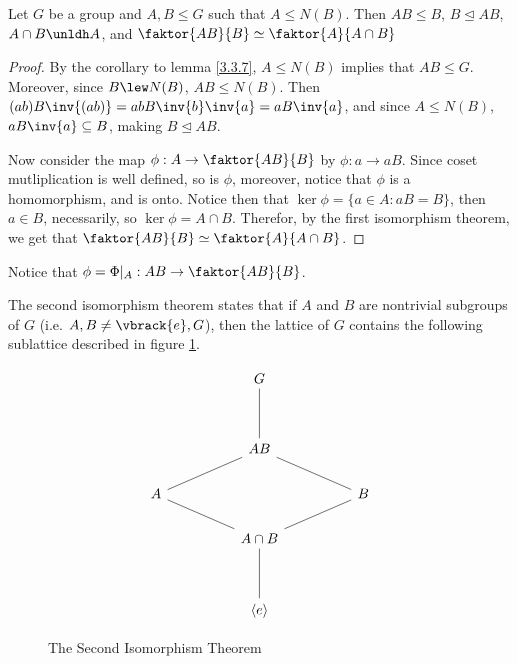 \begin{theorem}\label{3.4.4}
    Let $G$ be a group and  $A,B \leq G$ such that  $A \leq N(B)$. Then $AB \leq
    B$,  $B \unlhd AB$,  $A \cap B \unldh A$, and  $\faktor{AB}{B} \simeq
    \faktor{A}{A \cap B}$
\end{theorem}
\begin{proof}
    By the corollary to lemma \ref{3.3.7}, $A \leq N(B)$ implies that $AB \leq
    G$. Moreover, since  $B \lew N(B)$, $AB \leq N(B)$. Then
    $(ab)B\inv{(ab)}=abB\inv{b}\inv{a}=aB\inv{a}$, and since $A \leq N(B)$,
    $aB\inv{a} \subseteq B$, making $B \unlhd AB$.

    Now consider the map $\phi:A \rightarrow \faktor{AB}{B}$ by $\phi:a
    \rightarrow aB$. Since coset mutliplication is well defined, so is $\phi$,
    moreover, notice that  $\phi$ is a homomorphism, and is onto. Notice then
    that  $\ker{\phi}=\{a \in A : aB=B\}$, then $a \in B$, necessarily, so
    $\ker{\phi}=A \cap B$. Therefor, by the first isomorphism theorem, we get
    that $\faktor{AB}{B} \simeq \faktor{A}{A \cap B}$.
\end{proof}
\begin{remark}
    Notice that $\phi=\Phi|_{A}:AB \rightarrow \faktor{AB}{B}$.
\end{remark}
\begin{remark}
    The second isomorphism theorem states that if $A$ and $B$ are nontrivial
    subgroups of $G$  (i.e. $A,B \neq \vbrack{e}, G$), then the lattice of $G$
    contains the following sublattice described in figure \ref{fig_3.3}.
\end{remark}

\begin{figure}[h]
\[\begin{tikzcd}
	&& G \\
	\\
	&& AB \\
	A &&&& B \\
	&& {A \cap B} \\
	\\
	&& {\langle e \rangle}
	\arrow[no head, from=1-3, to=3-3]
	\arrow[no head, from=3-3, to=4-1]
	\arrow[no head, from=4-1, to=5-3]
	\arrow[no head, from=5-3, to=4-5]
	\arrow[no head, from=4-5, to=3-3]
	\arrow[no head, from=5-3, to=7-3]
\end{tikzcd}\]
    \caption{The Second Isomorphism Theorem}
    \label{fig_3.3}
\end{figure}

